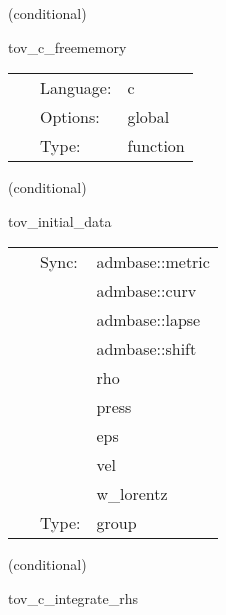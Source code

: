 \vspace{5mm}

   (conditional) 

\hspace{5mm} tov\_c\_freememory 

\hspace{5mm}{\it free memory from tovsolver\_c } 


\hspace{5mm}

 \begin{tabular*}{160mm}{cll} 
~ & Language:  & c \\ 
~ & Options:  & global \\ 
~ & Type:  & function \\ 
\end{tabular*} 


\vspace{5mm}

   (conditional) 

\hspace{5mm} tov\_initial\_data 

\hspace{5mm}{\it group for the tov initial data } 


\hspace{5mm}

 \begin{tabular*}{160mm}{cll} 
~ & Sync:  & admbase::metric \\ 
~& ~ &admbase::curv\\ 
~& ~ &admbase::lapse\\ 
~& ~ &admbase::shift\\ 
~& ~ &rho\\ 
~& ~ &press\\ 
~& ~ &eps\\ 
~& ~ &vel\\ 
~& ~ &w\_lorentz\\ 
~ & Type:  & group \\ 
\end{tabular*} 


\vspace{5mm}

   (conditional) 

\hspace{5mm} tov\_c\_integrate\_rhs 

\hspace{5mm}{\it integrate the 1d equations for the tov star } 


